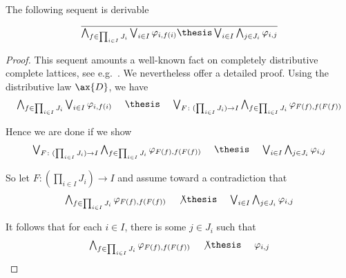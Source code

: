 \begin{lemma}
\label{lem:proof:log:distr}
The following sequent is derivable
\[
\dfrac{}
  {\bigwedge_{f \in \prod_{i \in I}J_i}\bigvee_{i \in I} \varphi_{i,f(i)}
  \thesis
  \bigvee_{i \in I}\bigwedge_{j \in J_i}\varphi_{i,j}}
\]
\end{lemma}

\begin{proof}
This sequent amounts a well-known fact on completely distributive
complete lattices,
see e.g.~\cite[Lemma VII.1.10]{johnstone82book}.
We nevertheless offer a detailed proof.
Using the distributive law $\ax{D}$, we have
\begin{equation*}
\begin{array}{l !{~}l!{~} l}
  \bigwedge_{f \in \prod_{i \in I}J_i}\bigvee_{i \in I} \varphi_{i,f(i)}
& \thesis
& \bigvee_{F\colon (\prod_{i \in I}J_i) \to I}
  \bigwedge_{f \in \prod_{i \in I}J_i}
  \varphi_{F(f),f(F(f))}
\end{array}
\end{equation*}

\noindent
Hence we are done if we show
\begin{equation*}
\begin{array}{l !{~}l!{~} l}
  \bigvee_{F\colon (\prod_{i \in I}J_i) \to I}
  \bigwedge_{f \in \prod_{i \in I}J_i}
  \varphi_{F(f),f(F(f))}
& \thesis
& \bigvee_{i \in I}\bigwedge_{j \in J_i}\varphi_{i,j}
\end{array}
\end{equation*}

\noindent
So let $F \colon \left(\prod_{i \in I}J_i\right)  \to I$
and assume toward a contradiction that 
\begin{equation*}
\begin{array}{l !{~}l!{~} l}
  \bigwedge_{f \in \prod_{i \in I}J_i}
  \varphi_{F(f),f(F(f))}
& \not\thesis
& \bigvee_{i \in I}\bigwedge_{j \in J_i}\varphi_{i,j}
\end{array}
\end{equation*}

\noindent
It follows that for each $i \in I$, there is some $j \in J_i$ such that
\begin{equation*}
\begin{array}{l !{~}l!{~} l}
  \bigwedge_{f \in \prod_{i \in I}J_i}
  \varphi_{F(f),f(F(f))}
& \not\thesis
& \varphi_{i,j}
\end{array}
\end{equation*}


\end{proof}
